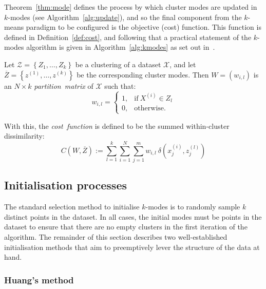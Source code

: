 Theorem~\ref{thm:mode} defines the process by which cluster modes are updated
in \(k\)-modes (see Algorithm~\ref{alg:update}), and so the final component from
the \(k\)-means paradigm to be configured is the objective (cost) function. This
function is defined in Definition~\ref{def:cost}, and following that a practical
statement of the \(k\)-modes algorithm is given in Algorithm~\ref{alg:kmodes} as
set out in~\cite{Huang1998}.

\begin{definition}\label{def:cost}
    Let \(\mathcal{Z} = \left\{Z_1, \ldots, Z_k\right\}\) be a clustering of a
    dataset \(\mathcal{X}\), and let \(\overline Z = \left\{z^{(1)},
    \ldots, z^{(k)}\right\}\) be the corresponding cluster modes. Then \(W =
    \left(w_{i, l}\right)\) is an \(N \times k\) \emph{partition~matrix} of
    \(\mathcal{X}\) such that:
    \[
        w_{i, l} = \begin{cases}
                     1, & \text{if} \ X^{(i)} \in Z_l\\
                     0, & \text{otherwise.}
                   \end{cases}
    \]

    With this, the \emph{cost~function} is defined to be the summed
    within-cluster dissimilarity:
    \begin{equation}\label{eq:cost}
        C\left(W, \overline Z\right) := \sum_{l=1}^{k} \sum_{i=1}^{N}
        \sum_{j=1}^{m} w_{i,l} \ \delta\left(x_j^{(i)}, z_j^{(l)}\right)
    \end{equation}
\end{definition}




\subsection{Initialisation processes}\label{subsec:inits}

The standard selection method to initialise \(k\)-modes is to randomly sample
\(k\) distinct points in the dataset. In all cases, the initial modes must be
points in the dataset to ensure that there are no empty clusters in the first
iteration of the algorithm. The remainder of this section describes two
well-established initialisation methods that aim to preemptively lever the
structure of the data at hand.

\subsubsection{Huang's method}\label{subsec:huang}

